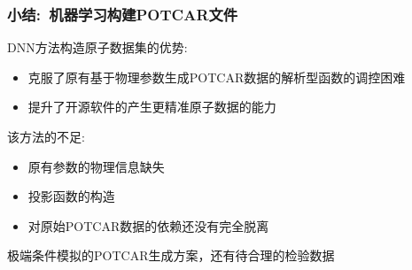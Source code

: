 \frame
{
	\frametitle{小结:~机器学习构建\textrm{POTCAR}文件}
	\textrm{DNN}方法构造原子数据集的优势:
	\begin{itemize}
		\item 克服了原有基于物理参数生成\textrm{POTCAR}数据的解析型函数的调控困难\\
			{\fontsize{8.0pt}{5.2pt}\selectfont{\textcolor{magenta}{多参数调控的难度大大降低}}}
		\item 提升了开源软件的产生更精准原子数据的能力\\%
			{\fontsize{8.0pt}{5.2pt}}
	\end{itemize}
%
	该方法的不足:
	\begin{itemize}
		\item 原有参数的物理信息缺失\\
			{\fontsize{8.0pt}{5.2pt}\selectfont{\textcolor{blue}{参数本身的复杂度增加，参数的物理含义变得模糊}}}
		\item 投影函数的构造\\
			{\fontsize{8.0pt}{5.2pt}}
		\item 对原始\textrm{POTCAR}数据的依赖还没有完全脱离\\
			{\fontsize{8.0pt}{5.2pt}}
	\end{itemize}
极端条件模拟的\textrm{POTCAR}生成方案，还有待合理的检验数据
}

